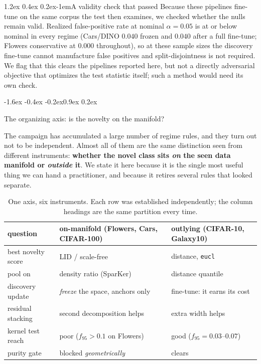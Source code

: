 \documentclass{article}
\makeatletter
\renewcommand\subsection{\@startsection{subsection}{2}{\z@}%
  {-1.6ex \@plus -0.4ex \@minus -0.2ex}{0.9ex \@plus 0.2ex}%
  {\normalsize\bf\raggedright}}
\renewcommand\paragraph{\@startsection{paragraph}{4}{\z@}%
  {1.2ex \@plus 0.4ex \@minus 0.2ex}{-1em}{\normalsize\bf}}
\makeatother
\begin{document}
\paragraph{A validity check that passed}
Because these pipelines fine-tune on the same corpus the test then examines,
we checked whether the nulls remain valid. Realized false-positive rate at
nominal $\alpha=0.05$ is at or below nominal in every regime (Cars/DINO
$0.040$ frozen and $0.040$ after a full fine-tune; Flowers conservative at
$0.000$ throughout), so at these sample sizes the discovery fine-tune cannot
manufacture false positives and split-disjointness is not required. We flag
that this clears the pipelines reported here, but not a directly adversarial
objective that optimizes the test statistic itself; such a method would need
its own check.

\subsection{The organizing axis: is the novelty on the manifold?}
\label{sec:axis}

The campaign has accumulated a large number of regime rules, and they turn out
not to be independent. Almost all of them are the same distinction seen from
different instruments: \textbf{whether the novel class sits \emph{on} the seen
data manifold or \emph{outside} it}. We state it here because it is the single
most useful thing we can hand a practitioner, and because it retires several
rules that looked separate.

\begin{table}[t]\centering\small
\begin{tabular}{lll}
\toprule
question & on-manifold (Flowers, Cars, CIFAR-100) & outlying (CIFAR-10, Galaxy10) \\
\midrule
best novelty score & LID / scale-free & distance, \texttt{eucl} \\
pool on & density ratio (SparKer) & distance quantile \\
discovery update & \emph{freeze} the space, anchors only & fine-tune: it earns its cost \\
residual stacking & second decomposition helps & extra width helps \\
kernel test reach & poor ($f_{95}>0.1$ on Flowers) & good ($f_{95}=0.03$--$0.07$) \\
purity gate & blocked \emph{geometrically} & clears \\
\bottomrule
\end{tabular}
\caption{One axis, six instruments. Each row was established independently; the
column headings are the same partition every time.}
\label{tab:axis}
\end{table}
\end{document}
